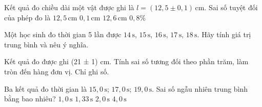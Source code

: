 \begin{ex}
Kết quả đo chiều dài một vật được ghi là $l=(12,5\pm0,1)\,\mathrm{cm}$. Sai số tuyệt đối của phép đo là
\choice
{$12,5\,\mathrm{cm}$}
{\True $0,1\,\mathrm{cm}$}
{$12,6\,\mathrm{cm}$}
{$0,8\%$}
\end{ex}


\begin{bt}
Một học sinh đo thời gian 5 lần được $14\,\text{s}$, $15\,\text{s}$, $16\,\text{s}$, $17\,\text{s}$, $18\,\text{s}$. Hãy tính giá trị trung bình và nêu ý nghĩa.
\end{bt}

\begin{ex}
Kết quả đo được ghi (21 ± 1) cm. Tính sai số tương đối theo phần trăm, làm tròn đến hàng đơn vị. Chỉ ghi số.
\end{ex}

\begin{ex}
Ba kết quả đo thời gian là $15,0\,\text{s}$; $17,0\,\text{s}$; $19,0\,\text{s}$. Sai số ngẫu nhiên trung bình bằng bao nhiêu?
\choice
{$1,0\,\text{s}$}
{\True $1,33\,\text{s}$}
{$2,0\,\text{s}$}
{$4,0\,\text{s}$}
\end{ex}


